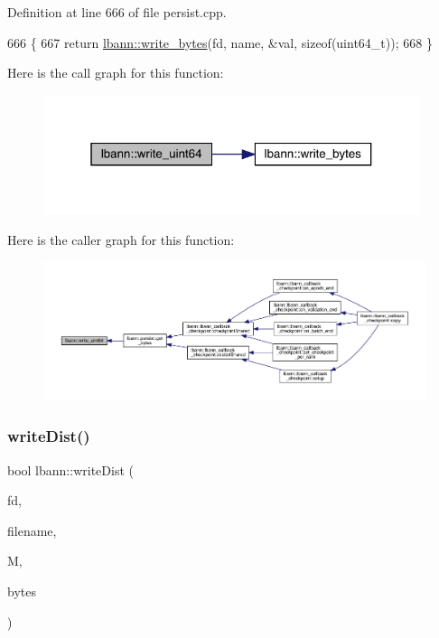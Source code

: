 Definition at line 666 of file persist.\+cpp.


\begin{DoxyCode}
666                                                                \{
667   \textcolor{keywordflow}{return} \hyperlink{namespacelbann_aed95061796f19fa1648dcc99dc335abd}{lbann::write\_bytes}(fd, name, &val, \textcolor{keyword}{sizeof}(uint64\_t));
668 \}
\end{DoxyCode}
Here is the call graph for this function\+:\nopagebreak
\begin{figure}[H]
\begin{center}
\leavevmode
\includegraphics[width=313pt]{namespacelbann_a234f8c7b9bbc2d9310d3e40314eb497c_cgraph}
\end{center}
\end{figure}
Here is the caller graph for this function\+:\nopagebreak
\begin{figure}[H]
\begin{center}
\leavevmode
\includegraphics[width=350pt]{namespacelbann_a234f8c7b9bbc2d9310d3e40314eb497c_icgraph}
\end{center}
\end{figure}
\mbox{\label{namespacelbann_af640a9302803636e0b5deb110c1aee57}} 
\subsubsection{\texorpdfstring{write\+Dist()}{writeDist()}}
{\footnotesize\ttfamily bool lbann\+::write\+Dist (\begin{DoxyParamCaption}\item[{int}]{fd,  }\item[{const char $\ast$}]{filename,  }\item[{const \hyperlink{base_8hpp_a0fab5387556805cfeac3e7e567bf66c5}{Dist\+Mat} \&}]{M,  }\item[{uint64\+\_\+t $\ast$}]{bytes }\end{DoxyParamCaption})}



